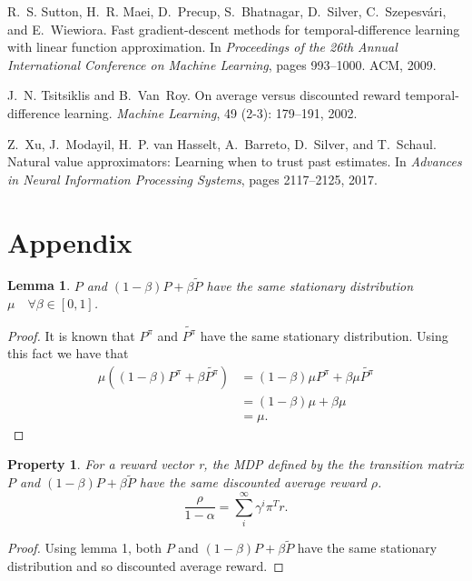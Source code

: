 \documentclass{article}
\newtheorem{lemma}{Lemma}
\newtheorem{property}{Property}
\newcommand{\param}{\beta}
\newcommand{\pol}{\pi}
\begin{document}
\begin{thebibliography}{36}
R.~S. Sutton, H.~R. Maei, D.~Precup, S.~Bhatnagar, D.~Silver,
  C.~Szepesv{\'a}ri, and E.~Wiewiora.
\newblock Fast gradient-descent methods for temporal-difference learning with
  linear function approximation.
\newblock In \emph{Proceedings of the 26th Annual International Conference on
  Machine Learning}, pages 993--1000. ACM, 2009.

J.~N. Tsitsiklis and B.~Van~Roy.
\newblock On average versus discounted reward temporal-difference learning.
\newblock \emph{Machine Learning}, 49 (2-3): 179--191, 2002.

Z.~Xu, J.~Modayil, H.~P. van Hasselt, A.~Barreto, D.~Silver, and T.~Schaul.
\newblock Natural value approximators: Learning when to trust past estimates.
\newblock In \emph{Advances in Neural Information Processing Systems}, pages
  2117--2125, 2017.

\end{thebibliography}
\clearpage
\section{Appendix}
\setcounter{lemma}{0}
\setcounter{property}{1}

\begin{lemma}
$P$ and $(1-\param) P + \param \widetilde{P}$ have the same stationary distribution $\mu \quad \forall \param \in [0,1]$.
\end{lemma}
\begin{proof}
It is known that $P^{\pol}$ and $\widetilde{P^{\pol}}$ have the same stationary distribution. Using this fact we have that
\begin{equation}
    \begin{split}
        \mu( (1-\param) P^{\pol} + \param \widetilde{P^{\pol}}) &=  (1-\param) \mu P^{\pol} + \param \mu \widetilde{P^{\pol}} \\
        &= (1-\param)\mu + \param \mu\\
        &= \mu.
    \end{split}
\end{equation}
\end{proof} 

\begin{property}
For a reward vector r, the MDP defined by the the transition matrix $P$ and $(1-\param) P + \param \widetilde{P}$ have the same discounted average reward $\rho$.
\begin{equation}
    \frac{\rho}{1-\alpha} = \sum_i^{\infty}\gamma^i \pi^T r.
\end{equation}
\end{property}
\begin{proof}
Using lemma 1, both $P$ and $(1-\param) P + \param \widetilde{P}$ have the same stationary distribution and so discounted average reward.
\end{proof}
\end{document}
